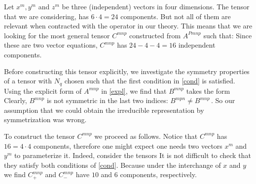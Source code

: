 \documentclass[11pt]{article}
\begin{document}
Let $x^m, y^m$ and $z^m$ be three (independent) vectors in four
dimensions. The tensor that we are considering, 
has $6 \cdot 4 = 24$ components. But not all of them are relevant when
contracted with the operator in our theory. This means that we are
looking for the most general tensor $C^{mnp}$ constructed from
$A^{Pmnp}$ such that: 
Since these are two vector equations, $C^{mnp}$ has $24 - 4-4=16$ 
independent components. 


Before constructing this tensor explicitly, we investigate the
symmetry properties of a tensor 
with $N_q$ chosen such that the first condition in \eqref{cond} is
satisfied. Using the explicit form of $A^{mnp}$ in \eqref{expl}, we
find that $B^{mnp}$ takes the form
Clearly, $B^{mnp}$ is not symmetric in the last two indices: 
$B^{mpn} \neq B^{mnp}\,$. So our assumption that we could obtain the
irreducible representation by symmetrization was wrong. 


To construct the tensor $C^{mnp}$ we proceed as follows. Notice that
$C^{mnp}$ has $16 =4\cdot 4$ components, therefore one might expect
one needs two vectors $x^m$ and $y^m$ to parameterize it. Indeed, 
consider the tensors
It is not difficult to check that they satisfy both conditions of
\eqref{cond}. Because under the interchange of $x$ and $y$ we find 
$C_+^{mnp}$ and $C_-^{mnp}$ have $10$ and $6$ components,
respectively. 
\end{document}
